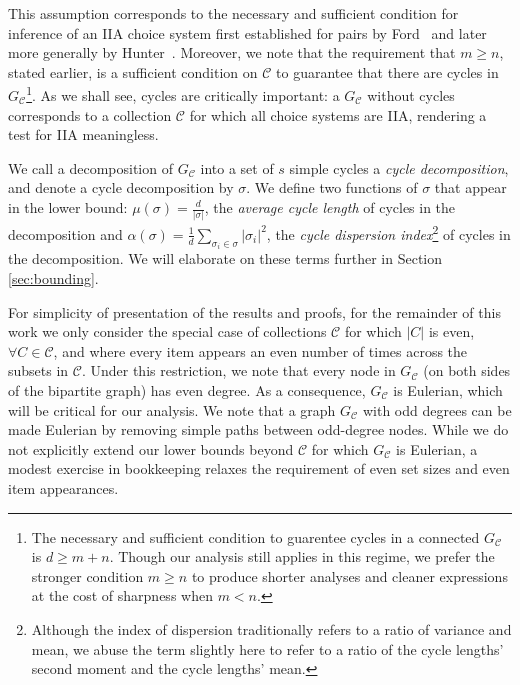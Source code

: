 \documentclass[10pt]{article}
\begin{document}
\begin{ReviewVerbatim}
	This assumption corresponds to the necessary and sufficient condition for inference of an IIA choice system first established for pairs by Ford~\cite{ford1957solution} and later more generally by Hunter~\cite{hunter2004mm}. Moreover, we note that the requirement that $m \geq n$, stated earlier, is a sufficient condition on $\mathcal{C}$ to guarantee that there are cycles in $G_\mathcal{C}$\footnote{The necessary and sufficient condition to guarentee cycles in a connected $G_\mathcal{C}$ is $d \geq m + n$. Though our analysis still applies in this regime, we prefer the stronger condition $m \geq n$ to produce shorter analyses and cleaner expressions at the cost of sharpness when $m < n$.}. As we shall see, cycles are critically important: a $G_\mathcal{C}$ without cycles corresponds to a collection $\mathcal{C}$ for which all choice systems are IIA, rendering a test for IIA meaningless.

	We call a decomposition of $G_\mathcal{C}$ into a set of $s$ simple cycles a {\it cycle decomposition}, and denote a cycle decomposition by $\sigma$. We define two functions of $\sigma$ that appear in the lower bound: $\mu(\sigma) = \frac{d}{|\sigma|}$, the \textit{average cycle length} of cycles in the decomposition and $\alpha(\sigma) = \frac{1}{d}\sum_{\sigma_i \in \sigma} |\sigma_i|^2$, the \textit{cycle dispersion index}\footnote{Although the index of dispersion traditionally refers to a ratio of variance and mean, we abuse the term slightly here to refer to a ratio of the cycle lengths' second moment and the cycle lengths' mean.} of cycles in the decomposition. We will elaborate on these terms further in Section \ref{sec:bounding}.

	For simplicity of presentation of the results and proofs, for the remainder of this work we only consider the special case of collections $\mathcal{C}$ for which $|C|$ is even, $\forall C \in \mathcal{C}$, and where every item appears an even number of times across the subsets in $\mathcal{C}$. Under this restriction, we note that every node in $G_\mathcal{C}$ (on both sides of the bipartite graph) has even degree. As a consequence, $G_\mathcal{C}$ is Eulerian, which will be critical for our analysis.
	We note that a graph $G_\mathcal{C}$ with odd degrees can be made Eulerian by removing simple paths between odd-degree nodes. While we do not explicitly extend our lower bounds beyond $\mathcal C$ for which $G_\mathcal{C}$ is Eulerian, a modest exercise in bookkeeping relaxes the requirement of even set sizes and even item appearances.


\end{ReviewVerbatim}
\end{document}
